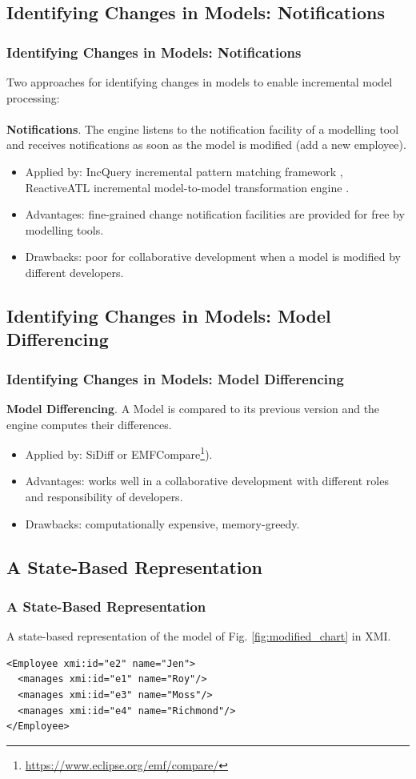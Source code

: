 \documentclass{beamer}
\begin{document}
\begin{frame}
\section{Identifying Changes in Models: Notifications}
\frametitle{Identifying Changes in Models: Notifications}
Two approaches for identifying changes in models to enable incremental model processing:\\
\hfill\\
\textbf{Notifications}. The engine listens to the notification facility of a modelling tool and receives notifications as soon as the model is modified (add a new employee). 
\begin{itemize}
\item Applied by: IncQuery incremental pattern matching framework \cite{rath2012derived}, ReactiveATL incremental model-to-model transformation engine \cite{ogunyomi2015property}. 
\item Advantages: fine-grained change notification facilities are provided for free by modelling tools.
\item Drawbacks: poor for collaborative development when a model is modified by different developers.
\end{itemize}
\end{frame}

\begin{frame}
\section{Identifying Changes in Models: Model Differencing}
\frametitle{Identifying Changes in Models: Model Differencing}
\textbf{Model Differencing}. A Model is compared to its previous version and the engine computes their differences.    
\begin{itemize}
\item Applied by: SiDiff \cite{kelter2005generic} or EMFCompare\footnote{\url{https://www.eclipse.org/emf/compare/}}).
\item Advantages: works well in a collaborative
development with different roles and responsibility of developers.
\item Drawbacks: computationally expensive, memory-greedy.
\end{itemize}
\end{frame}

\begin{frame}[fragile]
\section{A State-Based Representation}
\frametitle{A State-Based Representation}
A state-based representation of the model of Fig. \ref{fig:modified_chart} in XMI.
\begin{lstlisting}[style=xmi,label=lst:xmimodel]
<Employee xmi:id="e2" name="Jen">
  <manages xmi:id="e1" name="Roy"/>
  <manages xmi:id="e3" name="Moss"/>
  <manages xmi:id="e4" name="Richmond"/>
</Employee>
\end{lstlisting}
\end{frame}
\end{document}
